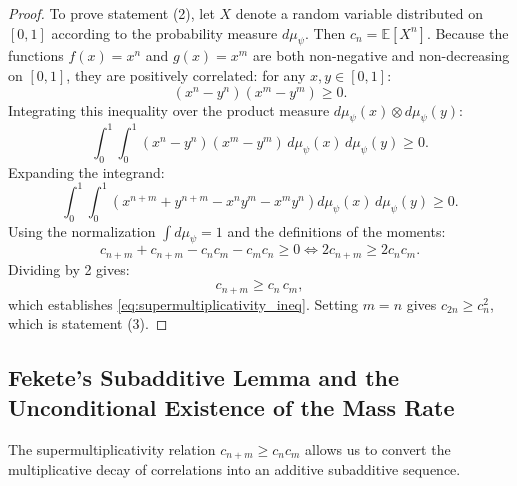 \begin{proof}
To prove statement (2), let $X$ denote a random variable distributed on $[0, 1]$ according to the probability measure $d\mu_\psi$. Then $c_n = \mathbb{E}[X^n]$. Because the functions $f(x) = x^n$ and $g(x) = x^m$ are both non-negative and non-decreasing on $[0, 1]$, they are positively correlated: for any $x, y \in [0, 1]$:
\begin{equation}
(x^n - y^n)(x^m - y^m) \ge 0.
\end{equation}
Integrating this inequality over the product measure $d\mu_\psi(x) \otimes d\mu_\psi(y)$:
\begin{equation}
\int_0^1 \int_0^1 (x^n - y^n)(x^m - y^m) \, d\mu_\psi(x) \, d\mu_\psi(y) \ge 0.
\end{equation}
Expanding the integrand:
\begin{equation}
\int_0^1 \int_0^1 \left( x^{n+m} + y^{n+m} - x^n y^m - x^m y^n \right) d\mu_\psi(x) \, d\mu_\psi(y) \ge 0.
\end{equation}
Using the normalization $\int d\mu_\psi = 1$ and the definitions of the moments:
\begin{equation}
c_{n+m} + c_{n+m} - c_n c_m - c_m c_n \ge 0 \iff 2 c_{n+m} \ge 2 c_n c_m.
\end{equation}
Dividing by 2 gives:
\begin{equation}
c_{n+m} \ge c_n \, c_m,
\end{equation}
which establishes \eqref{eq:supermultiplicativity_ineq}. Setting $m = n$ gives $c_{2n} \ge c_n^2$, which is statement (3).
\end{proof}

\subsection{Fekete's Subadditive Lemma and the Unconditional Existence of the Mass Rate}
\label{subsec:fekete_proof}

The supermultiplicativity relation $c_{n+m} \ge c_n c_m$ allows us to convert the multiplicative decay of correlations into an additive subadditive sequence.


